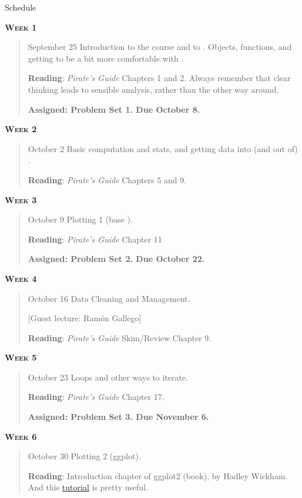 \documentclass[11pt,letterpaper]{article}
\begin{document}
\pagebreak

\huge Schedule
\hrulefill

\normalsize


\textbf{\textsc{Week 1}}
		\begin{quote}	
		September 25 \textbullet \space Introduction to the course and to \R. Objects, functions, and getting to be a bit more comfortable with \R.
		
		\textbf{Reading}: \textit{Pirate's Guide} Chapters 1 and 2. 
		Always remember that clear thinking leads to sensible analysis, rather than the other way around.
		
		\textbf{Assigned: Problem Set 1.  Due October 8.}
		
		\end{quote}

\textbf{\textsc{Week 2}}
		\begin{quote}	
		October 2  \textbullet \space Basic computation and stats, and getting data into (and out of) \R. 
		
		\textbf{Reading}: \textit{Pirate's Guide} Chapters 5 and 9.	
		\end{quote}

\textbf{\textsc{Week 3}}
		\begin{quote}	
		October 9  \textbullet \space Plotting 1 (base \R). 
		
		\textbf{Reading}: \textit{Pirate's Guide} Chapter 11

		\textbf{Assigned: Problem Set 2.  Due October 22.}

		\end{quote}

\textbf{\textsc{Week 4}}
		\begin{quote}	
		October 16  \textbullet \space Data Cleaning and Management. 
		
		[Guest lecture: Ramón Gallego]
		
		\textbf{Reading}: \textit{Pirate's Guide} Skim/Review Chapter 9.
		\end{quote}


\textbf{\textsc{Week 5}}
		\begin{quote}	
		October 23  \textbullet \space Loops and other ways to iterate. 
		
		\textbf{Reading}: \textit{Pirate's Guide} Chapter 17.

		\textbf{Assigned: Problem Set 3.  Due November 6.}

		\end{quote}

\textbf{\textsc{Week 6}}
		\begin{quote}	
		October 30  \textbullet \space Plotting 2 (ggplot). 
		
		\textbf{Reading}: Introduction chapter of ggplot2 (book), by Hadley Wickham.  And this \href{http://r-statistics.co/Complete-Ggplot2-Tutorial-Part1-With-R-Code.html}{\underline{tutorial}} is pretty useful.

		\end{quote}
\end{document}
